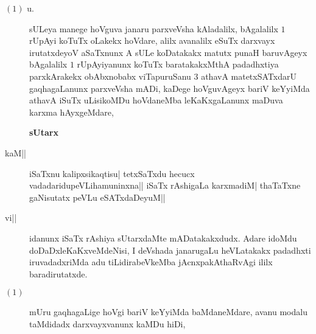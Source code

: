 \newpage



\begin{description}
\item[$(1)$ u.] sULeya manege hoVguva janaru parxveVsha kAladalilx,
bAgalalilx $1$ rUpAyi koTuTx oLakekx hoVdare, alilx avanalilx eSuTx
darxvayx irutatxdeyoV aSaTxnunx A sULe koDatakakx matutx punaH
baruvAgeyx bAgalalilx $1$ rUpAyiyanunx koTuTx baratakakxMthA padadhxtiya
parxkArakekx obAbxnobabx viTapuruSanu $3$ athavA matetxSATxdarU
gaqhagaLanunx parxveVsha mADi, kaDege hoVguvAgeyx bariV keYyiMda
athavA iSuTx uLisikoMDu hoVdaneMba leKaKxgaLanunx maDuva karxma
hAyxgeMdare,

\centerline{\bf \Large sUtarx}

\item[kaM||] iSaTxnu kalipxsikaqtisu| tetxSaTxdu hecucx
vadadaridupeVLihamuninxna|| iSaTx rAshigaLa karxmadiM| thaTaTxne
gaNisutatx peVLu eSATxdaDeyuM||

\item[vi||] idanunx iSaTx rAshiya sUtarxdaMte mADatakakxdudx. Adare
idoMdu doDaDxleKaKxveMdeNisi, I deVshada janarugaLu heVLatakakx
padadhxti iruvadadxriMda adu tiLidirabeVkeMba jAcnxpakAthaRvAgi ililx
baradirutatxde. 

\item[$(1)$] mUru gaqhagaLige hoVgi bariV keYyiMda baMdaneMdare, avanu
modalu taMdidadx darxvayxvanunx kaMDu hiDi,


\end{description}
